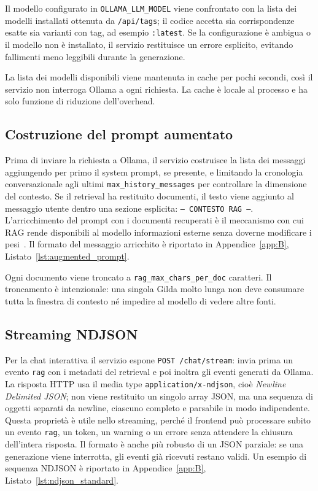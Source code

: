 Il modello configurato in \texttt{OLLAMA\_LLM\_MODEL} viene confrontato con la
lista dei modelli installati ottenuta da \texttt{/api/tags}; il codice accetta
sia corrispondenze esatte sia varianti con tag, ad esempio \texttt{:latest}. Se
la configurazione è ambigua o il modello non è installato, il servizio
restituisce un errore esplicito, evitando fallimenti meno leggibili durante la
generazione.

La lista dei modelli disponibili viene mantenuta in cache per pochi secondi,
così il servizio non interroga Ollama a ogni richiesta. La cache è locale al
processo e ha solo funzione di riduzione dell'overhead.

\subsection{Costruzione del prompt aumentato}
\label{subsec:implementation_augmented_prompt}

Prima di inviare la richiesta a Ollama, il servizio costruisce la lista dei
messaggi aggiungendo per primo il system prompt, se presente, e limitando la
cronologia conversazionale agli ultimi \texttt{max\_history\_messages} per
controllare la dimensione del contesto. Se il retrieval ha restituito documenti,
il testo viene aggiunto al messaggio utente dentro una sezione esplicita:
\texttt{--- CONTESTO RAG ---}. L'arricchimento del prompt con i documenti recuperati è
il meccanismo con cui RAG rende disponibili al modello informazioni esterne
senza doverne modificare i pesi~\cite{lewis2020retrieval}. Il formato del messaggio
arricchito è riportato in Appendice~\ref{app:B}, Listato~\ref{lst:augmented_prompt}.

Ogni documento viene troncato a \texttt{rag\_max\_chars\_per\_doc} caratteri.
Il troncamento è intenzionale: una singola Gilda molto lunga non deve consumare
tutta la finestra di contesto né impedire al modello di vedere altre fonti.

\subsection{Streaming NDJSON}
\label{subsec:implementation_streaming}

Per la chat interattiva il servizio espone \texttt{POST /chat/stream}: invia
prima un evento \texttt{rag} con i metadati del retrieval e poi inoltra gli
eventi generati da Ollama. La risposta HTTP usa il media type
\texttt{application/x-ndjson}, cioè \emph{Newline Delimited JSON}; non viene
restituito un singolo array JSON, ma una sequenza di oggetti separati da newline,
ciascuno completo e parsabile in modo indipendente. Questa proprietà è utile
nello streaming, perché il frontend può processare subito un evento
\texttt{rag}, un token, un warning o un errore senza attendere la chiusura
dell'intera risposta. Il formato è anche più robusto di un JSON parziale: se una
generazione viene interrotta, gli eventi già ricevuti restano validi. Un esempio
di sequenza NDJSON è riportato in
Appendice~\ref{app:B}, Listato~\ref{lst:ndjson_standard}.

